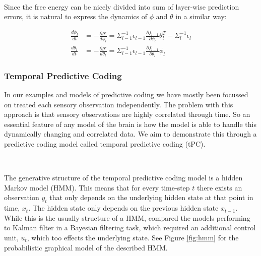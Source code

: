 \documentclass{article}
\begin{document}
\

Since the free energy can be nicely divided into sum of layer-wise prediction errors, it is natural to express the dynamics of $\phi$ and $\theta$ in a similar way:

\begin{equation}
	\begin{aligned}
		\frac{d\phi_l}{dt} &= - \frac{\partial \mathcal{F}}{d\phi_l} = \Sigma_{l - 1}^{- 1} \epsilon_{l - 1} \frac{\partial f_{l - 1}}{\partial \phi_{l}} \theta_l^T - \Sigma_{l}^{-1} \epsilon_l \\
		\frac{d\theta_l}{dt} &= - \frac{\partial \mathcal{F}}{d\theta_l} = \Sigma_{l - 1}^{- 1} \epsilon_{l - 1} \frac{\partial f_{l - 1}}{\partial \theta_{l}} \phi_l
	\end{aligned}
\end{equation}

\subsubsection{Temporal Predictive Coding}

In our examples and models of predictive coding we have mostly been focussed on treated each sensory observation independently. The problem with this approach is that sensory observations are highly correlated through time. So an essential feature of any model of the brain is how the model is able to handle this dynamically changing and correlated data. We aim to demonstrate this through a predictive coding model called temporal predictive coding (tPC). 

\

The generative structure of the temporal predictive coding model is a hidden Markov model (HMM). This means that for every time-step $t$ there exists an observation $y_t$ that only depends on the underlying hidden state at that point in time, $x_t$. The hidden state only depends on the previous hidden state $x_{t-1}$. While this is the usually structure of a HMM, \citet{millidge2024temporal} compared the models performing to Kalman filter in a Bayesian filtering task, which required an additional control unit, $u_t$, which too effects the underlying state. See Figure \ref{fig:hmm} for the probabilistic graphical model of the described HMM. 

\
\end{document}
